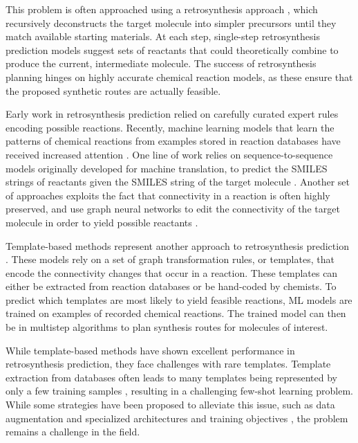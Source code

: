 This problem is often approached using a retrosynthesis approach
\citep{coreyComputerAssistedDesignComplex1969,coreyLogicChemicalSynthesis1991a}, which
recursively deconstructs the target molecule into simpler precursors until they match available
starting materials. At each step, single-step retrosynthesis prediction models suggest sets of
reactants that could theoretically combine to produce the current, intermediate molecule.
The success of retrosynthesis planning hinges on highly accurate chemical reaction models, as these
ensure that the proposed synthetic routes are actually feasible.

Early work in retrosynthesis prediction relied on carefully curated expert rules encoding possible
reactions. Recently, machine learning models that learn the patterns of chemical reactions from
examples stored in reaction databases have received increased attention
\citep{coleyMachineLearningComputerAided2018,strieth-kalthoffMachineLearningRopes2020}. One line of
work relies on sequence-to-sequence models originally developed for machine translation, to predict
the SMILES strings of reactants given the SMILES string of the target molecule
\citep{schwallerMolecularTransformerModel2019,namLinkingNeuralMachine2016,schwallerFoundTranslationPredicting2018,karpovTransformerModelRetrosynthesis2019,tetkoStateoftheartAugmentedNLP2020}.
Another set of approaches exploits the fact that connectivity in a reaction is often highly
preserved, and use graph neural networks to edit the connectivity of the target molecule in order to
yield possible reactants
\citep{sachaMoleculeEditGraph2020,shiGraphGraphsFramework2020,somnathLearningGraphModels2020,yanRetroXpertDecomposeRetrosynthesis2020}.

Template-based methods represent another approach to retrosynthesis prediction
\citep{seglerNeuralSymbolicMachineLearning2017,seglerPlanningChemicalSyntheses2018,daiRetrosynthesisPredictionConditional2020,sunEnergybasedViewRetrosynthesis2020}.
These models rely on a set of graph transformation rules, or templates, that encode the connectivity
changes that occur in a reaction. These templates can either be extracted from reaction databases or
be hand-coded by chemists. To predict which templates are most likely to yield feasible reactions,
\ac{ML} models are trained on examples of recorded chemical reactions. The trained model can then be
in multistep algorithms to plan synthesis routes for molecules of interest.

While template-based methods have shown excellent performance in retrosynthesis prediction, they
face challenges with rare templates. Template extraction from databases often leads to many
templates being represented by only a few training samples
\citep{fortunatoDataAugmentationPretraining2020}, resulting in a challenging few-shot learning
problem. While some strategies have been proposed to alleviate this issue, such as data augmentation
\citep{fortunatoDataAugmentationPretraining2020} and specialized architectures and training
objectives \citep{daiRetrosynthesisPredictionConditional2020}, the problem remains a challenge in
the field.

